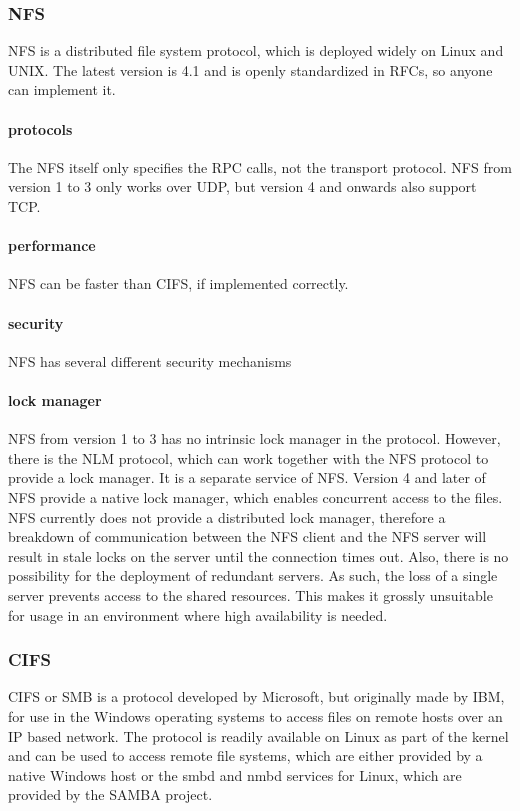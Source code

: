 \subsubsection{\ac{NFS}}
\ac{NFS} is a distributed file system protocol, which is deployed widely on Linux and UNIX. 
The latest version is 4.1 and is openly standardized in RFCs, so anyone can implement it.
\paragraph{protocols}
The \ac{NFS} itself only specifies the \ac{RPC} calls, not the transport protocol.
\ac{NFS} from version 1 to 3 only works over \ac{UDP}, but version 4 and onwards also support
\ac{TCP}.
\paragraph{performance}
\ac{NFS} can be faster than \ac{CIFS}, if implemented correctly.
\paragraph{security}
\ac{NFS} has several different security mechanisms
\paragraph{lock manager}
\ac{NFS} from version 1 to 3 has no intrinsic lock manager in the protocol. However, there is the \ac{NLM}
protocol, which can work together with the \ac{NFS} protocol to provide a lock manager.
It is a separate service of \ac{NFS}.
Version 4 and later of \ac{NFS} provide a native lock manager, which enables concurrent access to the files.
\linebreak[3]
\ac{NFS} currently does not provide a distributed lock manager, therefore a breakdown
of communication between the \ac{NFS} client and the \ac{NFS} server will result in stale locks
on the server until the connection times out. Also, there is no possibility
for the deployment of redundant servers. As such, the loss of a single server prevents
access to the shared resources. This makes it grossly unsuitable for usage in an environment
where high availability is needed.

\subsubsection{\ac{CIFS}}
\ac{CIFS} or \ac{SMB} is a protocol developed by Microsoft, but originally made
by IBM, for use in the Windows operating systems to access files on remote hosts
over an IP based network. The protocol is readily available on Linux as part
of the kernel and can be used to access remote file systems, which are
either provided by a native Windows host or the smbd and nmbd services for Linux,
which are provided by the SAMBA project.
